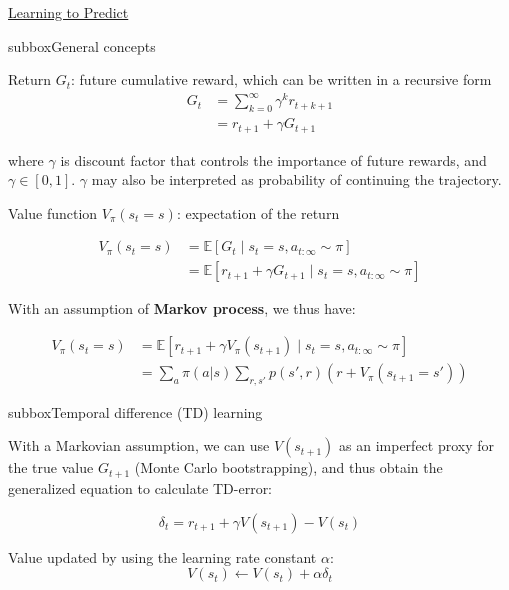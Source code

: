 \begin{textbox}{\href{https://compneuro.neuromatch.io/tutorials/W3D4_ReinforcementLearning/student/W3D4_Tutorial1.html}{Learning to Predict } }
\begin{subbox}{subbox}{General concepts}
\scriptsize


Return $G_{t}$: future cumulative reward, which can be written in a recursive form
\begin{align}
G_{t} &= \sum \limits_{k = 0}^{\infty} \gamma^{k} r_{t+k+1} \\
&= r_{t+1} + \gamma G_{t+1}
\end{align}

where $\gamma$ is discount factor that controls the importance of future rewards, and $\gamma \in [0, 1]$. $\gamma$ may also be interpreted as probability of continuing the trajectory.

Value function $V_{\pi}(s_t=s)$: expectation of the return

\begin{align}
V_{\pi}(s_t=s) &= \mathbb{E} [ G_{t}\; | \; s_t=s, a_{t:\infty}\sim\pi] \\
& = \mathbb{E} [ r_{t+1} + \gamma G_{t+1}\; | \; s_t=s, a_{t:\infty}\sim\pi]
\end{align}

With an assumption of \textbf{Markov process}, we thus have:

\begin{align}
V_{\pi}(s_t=s) &= \mathbb{E} [ r_{t+1} + \gamma V_{\pi}(s_{t+1})\; | \; s_t=s, a_{t:\infty}\sim\pi] \\
&= \sum_a \pi(a|s) \sum_{r, s'}p(s', r)(r + V_{\pi}(s_{t+1}=s'))
\end{align}
\end{subbox}
\begin{subbox}{subbox}{Temporal difference (TD) learning}
\scriptsize

With a Markovian assumption, we can use $V(s_{t+1})$ as an imperfect proxy for the true value $G_{t+1}$ (Monte Carlo bootstrapping), and thus obtain the generalized equation to calculate TD-error:

\begin{equation}
\delta_{t} = r_{t+1} + \gamma V(s_{t+1}) - V(s_{t})
\end{equation}

Value updated by using the learning rate constant $\alpha$:
\begin{equation}
V(s_{t}) \leftarrow V(s_{t}) + \alpha \delta_{t}
\end{equation}


\end{subbox}
\end{textbox}
